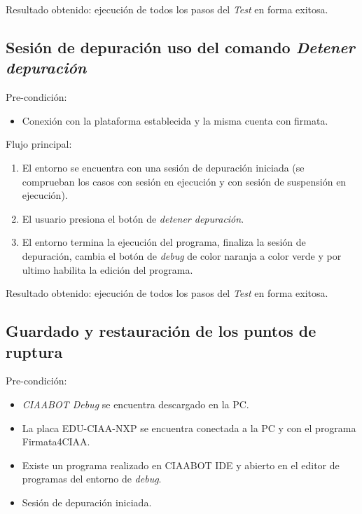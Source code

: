 Resultado obtenido: ejecución de todos los pasos del \emph{Test} en forma exitosa. 


\subsection{Sesión de depuración uso del comando \emph{Detener depuración}}
Pre-condición:
\begin{itemize}
	\item Conexión con la plataforma establecida y la misma cuenta con firmata.
\end{itemize}

Flujo principal:
\begin{enumerate}
	\item
El entorno se encuentra con una sesión de depuración iniciada (se comprueban los casos con sesión en ejecución y con sesión de suspensión en ejecución).
	\item
	El usuario presiona el botón de \emph{detener depuración}.
	\item
	El entorno termina la ejecución del programa, finaliza la sesión de depuración, cambia el botón de \emph{debug} de color naranja a color verde y por ultimo habilita la edición del programa.
\end{enumerate}

Resultado obtenido: ejecución de todos los pasos del \emph{Test} en forma exitosa. 

\subsection{Guardado y restauración de los puntos de ruptura}
Pre-condición:
\begin{itemize}
	\item \emph{CIAABOT Debug} se encuentra descargado en la PC.
    \item La placa EDU-CIAA-NXP se encuentra conectada a la PC y con el programa Firmata4CIAA.
    \item Existe un programa realizado en CIAABOT IDE y abierto en el editor de programas del entorno de \emph{debug}.
    \item Sesión de depuración iniciada.
\end{itemize}

